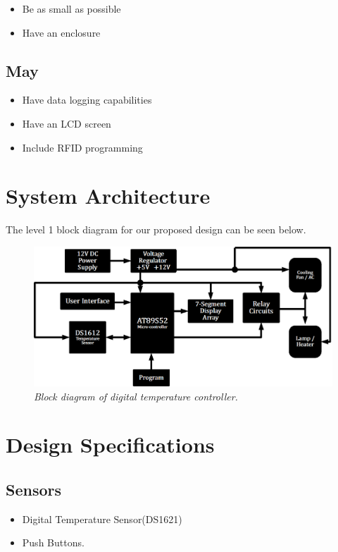 \documentclass[11pt]{article}
\begin{document}
\begin{itemize}

    \item Be as small as possible
    \item Have an enclosure

\end{itemize}
		
\subsection*{May}

\begin{itemize}

    \item Have data logging capabilities
    \item Have an LCD screen
    \item Include RFID programming

\end{itemize}

\section*{System Architecture}
The level 1 block diagram for our proposed design can be seen below.
	
	\begin{figure}[H]
	\centering
	\includegraphics[width=5in]{images/TCU}
		\caption{\textit{Block diagram of digital temperature controller.}}
	\end{figure}

\section*{Design Specifications}

\subsection*{Sensors}
\begin{itemize}
	\setlength\itemsep{-2px}
    \item Digital Temperature Sensor(DS1621)
    \item Push Buttons.

\end{itemize}
\end{document}
